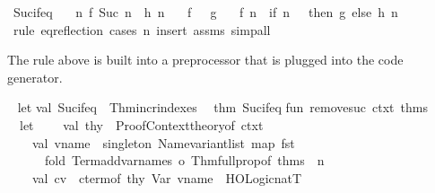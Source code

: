 \begin{isabellebody}
\ Suc{\isacharunderscore}if{\isacharunderscore}eq{\isacharcolon}\isanewline
\ \ \ {\isachardoublequoteopen}{\isasymAnd}n{\isachardot}\ f\ {\isacharparenleft}Suc\ n{\isacharparenright}\ {\isasymequiv}\ h\ n{\isachardoublequoteclose}\isanewline
\ \ \ {\isachardoublequoteopen}f\ {}\ {\isasymequiv}\ g{\isachardoublequoteclose}\isanewline
\ \ \ {\isachardoublequoteopen}f\ n\ {\isasymequiv}\ if\ n\ {\isacharequal}\ {}\ then\ g\ else\ h\ {\isacharparenleft}n\ {\isacharminus}\ {}{\isacharparenright}{\isachardoublequoteclose}\isanewline
%
\isadelimproof
\ \ %
\endisadelimproof
%
\isatagproof
{}\isamarkupfalse%
\ {\isacharparenleft}rule\ eq{\isacharunderscore}reflection{\isacharparenright}\ {\isacharparenleft}cases\ n{\isacharcomma}\ insert\ assms{\isacharcomma}\ simp{\isacharunderscore}all{\isacharparenright}%
\endisatagproof
{\isafoldproof}%
%
\isadelimproof
%
\endisadelimproof
%
\begin{isamarkuptext}%
The rule above is built into a preprocessor that is plugged into
  the code generator.%
\end{isamarkuptext}%
\isamarkuptrue%
%
\isadelimML
%
\endisadelimML
%
\isatagML
{}\isamarkupfalse%
\ {\isacharverbatimopen}\isanewline
let\isanewline
\isanewline
val\ Suc{\isacharunderscore}if{\isacharunderscore}eq\ {\isacharequal}\ Thm{\isachardot}incr{\isacharunderscore}indexes\ {}\ %
\isaantiq
thm\ Suc{\isacharunderscore}if{\isacharunderscore}eq{}%
\endisaantiq
{\isacharsemicolon}\isanewline
\isanewline
fun\ remove{\isacharunderscore}suc\ ctxt\ thms\ {\isacharequal}\isanewline
\ \ let\isanewline
\ \ \ \ val\ thy\ {\isacharequal}\ Proof{\isacharunderscore}Context{\isachardot}theory{\isacharunderscore}of\ ctxt{\isacharsemicolon}\isanewline
\ \ \ \ val\ vname\ {\isacharequal}\ singleton\ {\isacharparenleft}Name{\isachardot}variant{\isacharunderscore}list\ {\isacharparenleft}map\ fst\isanewline
\ \ \ \ \ \ {\isacharparenleft}fold\ {\isacharparenleft}Term{\isachardot}add{\isacharunderscore}var{\isacharunderscore}names\ o\ Thm{\isachardot}full{\isacharunderscore}prop{\isacharunderscore}of{\isacharparenright}\ thms\ {\isacharbrackleft}{\isacharbrackright}{\isacharparenright}{\isacharparenright}{\isacharparenright}\ {\isachardoublequote}n{\isachardoublequote}{\isacharsemicolon}\isanewline
\ \ \ \ val\ cv\ {\isacharequal}\ cterm{\isacharunderscore}of\ thy\ {\isacharparenleft}Var\ {\isacharparenleft}{\isacharparenleft}vname{\isacharcomma}\ {}{\isacharparenright}{\isacharcomma}\ HOLogic{\isachardot}natT{\isacharparenright}{\isacharparenright}{\isacharsemicolon}\isanewline

\end{isabellebody}
